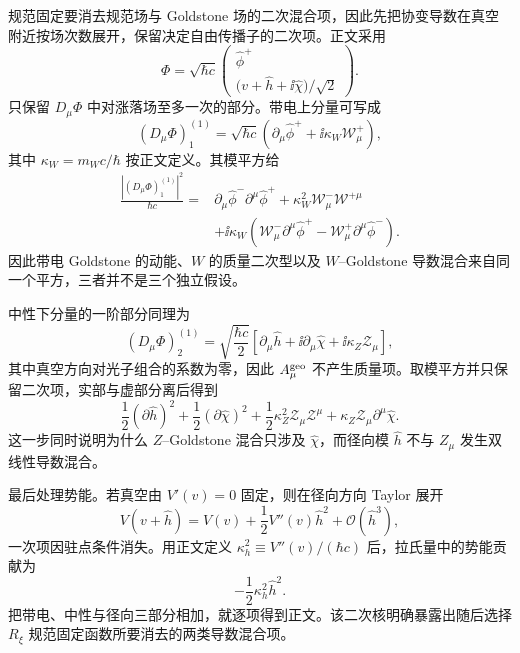 \begin{derivation}[电弱真空附近的二次涨落与混合项]
规范固定要消去规范场与 Goldstone 场的二次混合项，因此先把协变导数在真空附近按场次数展开，保留决定自由传播子的二次项。正文采用
\begin{equation*}
\Phi
=\sqrt{\hbar c}
\begin{pmatrix}
\widehat\phi^+\\[2pt]
\bigl(v+\widehat h+\ii\widehat\chi\bigr)/\sqrt2
\end{pmatrix}.
\end{equation*}
只保留 \(D_\mu\Phi\) 中对涨落场至多一次的部分。带电上分量可写成
\begin{equation*}
(D_\mu\Phi)_1^{(1)}
=\sqrt{\hbar c}\left(
\partial_\mu\widehat\phi^+
+\ii\kappa_W\mathcal W_\mu^+
\right),
\end{equation*}
其中 \(\kappa_W=m_Wc/\hbar\) 按正文定义。其模平方给
\begin{align*}
\frac{|(D_\mu\Phi)_1^{(1)}|^2}{\hbar c}
={}&\partial_\mu\widehat\phi^-\partial^\mu\widehat\phi^+
+\kappa_W^2\mathcal W^-_\mu\mathcal W^{+\mu}\\
&+\ii\kappa_W
\left(
\mathcal W^-_\mu\partial^\mu\widehat\phi^+
-\mathcal W^+_\mu\partial^\mu\widehat\phi^-
\right).
\end{align*}
因此带电 Goldstone 的动能、\(W\) 的质量二次型以及 \(W\)--Goldstone 导数混合来自同一个平方，三者并不是三个独立假设。

中性下分量的一阶部分同理为
\begin{equation*}
(D_\mu\Phi)_2^{(1)}
=\sqrt{\frac{\hbar c}{2}}
\left[
\partial_\mu\widehat h
+\ii\partial_\mu\widehat\chi
+\ii\kappa_Z\mathcal Z_\mu
\right],
\end{equation*}
其中真空方向对光子组合的系数为零，因此 \(A_\mu^{\rm geo}\) 不产生质量项。取模平方并只保留二次项，实部与虚部分离后得到
\begin{equation*}
\frac12(\partial\widehat h)^2
+\frac12(\partial\widehat\chi)^2
+\frac12\kappa_Z^2\mathcal Z_\mu\mathcal Z^\mu
+\kappa_Z\mathcal Z_\mu\partial^\mu\widehat\chi.
\end{equation*}
这一步同时说明为什么 \(Z\)--Goldstone 混合只涉及 \(\widehat\chi\)，而径向模 \(\widehat h\) 不与 \(Z_\mu\) 发生双线性导数混合。

最后处理势能。若真空由 \(V'(v)=0\) 固定，则在径向方向 Taylor 展开
\begin{equation*}
V(v+\widehat h)
=V(v)+\frac12V''(v)\widehat h^2
+\mathcal O(\widehat h^3),
\end{equation*}
一次项因驻点条件消失。用正文定义 \(\kappa_h^2\equiv V''(v)/(\hbar c)\) 后，拉氏量中的势能贡献为
\begin{equation*}
-\frac12\kappa_h^2\widehat h^2.
\end{equation*}
把带电、中性与径向三部分相加，就逐项得到正文。该二次核明确暴露出随后选择 \(R_\xi\) 规范固定函数所要消去的两类导数混合项。
\end{derivation}

